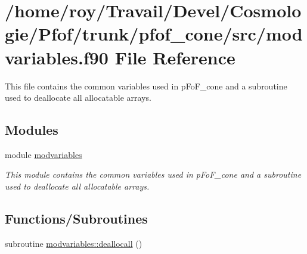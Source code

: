 \hypertarget{modvariables_8f90}{}\section{/home/roy/\+Travail/\+Devel/\+Cosmologie/\+Pfof/trunk/pfof\+\_\+cone/src/modvariables.f90 File Reference}
\label{modvariables_8f90}


This file contains the common variables used in p\+Fo\+F\+\_\+cone and a subroutine used to deallocate all allocatable arrays.  


\subsection*{Modules}
\begin{DoxyCompactItemize}
\item 
module \hyperlink{namespacemodvariables}{modvariables}
\begin{DoxyCompactList}\small\item\em This module contains the common variables used in p\+Fo\+F\+\_\+cone and a subroutine used to deallocate all allocatable arrays. \end{DoxyCompactList}\end{DoxyCompactItemize}
\subsection*{Functions/\+Subroutines}
\begin{DoxyCompactItemize}
\item 
subroutine \hyperlink{namespacemodvariables_a1b90ef0a0d8979fdfc0a578bbd2f3e17}{modvariables\+::deallocall} ()
\end{DoxyCompactItemize}
